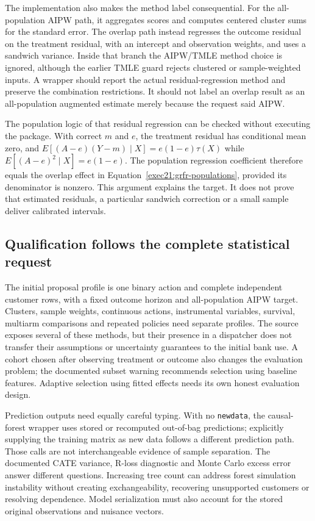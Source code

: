 The implementation also makes the method label consequential. For the all-population AIPW path, it aggregates scores and computes centered cluster sums for the standard error. The overlap path instead regresses the outcome residual on the treatment residual, with an intercept and observation weights, and uses a sandwich variance. Inside that branch the AIPW/TMLE method choice is ignored, although the earlier TMLE guard rejects clustered or sample-weighted inputs. A wrapper should report the actual residual-regression method and preserve the combination restrictions. It should not label an overlap result as an all-population augmented estimate merely because the request said AIPW.~\citep{exec21_grf_reuse}

The population logic of that residual regression can be checked without executing the package. With correct $m$ and $e$, the treatment residual has conditional mean zero, and
$E[(A-e)(Y-m)\mid X]=e(1-e)\tau(X)$ while
$E[(A-e)^2\mid X]=e(1-e)$. The population regression coefficient therefore equals the overlap effect in Equation~\eqref{exec21:grfr-populations}, provided its denominator is nonzero. This argument explains the target. It does not prove that estimated residuals, a particular sandwich correction or a small sample deliver calibrated intervals.

\subsection{Qualification follows the complete statistical request}
\label{exec21:grfr-contract}
The initial proposal profile is one binary action and complete independent customer rows, with a fixed outcome horizon and all-population AIPW target. Clusters, sample weights, continuous actions, instrumental variables, survival, multiarm comparisons and repeated policies need separate profiles. The source exposes several of these methods, but their presence in a dispatcher does not transfer their assumptions or uncertainty guarantees to the initial bank use. A cohort chosen after observing treatment or outcome also changes the evaluation problem; the documented subset warning recommends selection using baseline features. Adaptive selection using fitted effects needs its own honest evaluation design.~\citep{exec21_grf_reuse}

Prediction outputs need equally careful typing. With no \texttt{newdata}, the causal-forest wrapper uses stored or recomputed out-of-bag predictions; explicitly supplying the training matrix as new data follows a different prediction path. Those calls are not interchangeable evidence of sample separation. The documented CATE variance, R-loss diagnostic and Monte Carlo excess error answer different questions. Increasing tree count can address forest simulation instability without creating exchangeability, recovering unsupported customers or resolving dependence. Model serialization must also account for the stored original observations and nuisance vectors.~\citep{exec21_grf_reuse}


